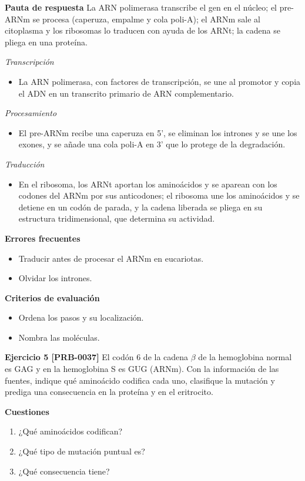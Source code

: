 \documentclass{book}
\begin{document}
\noindent\textbf{Pauta de respuesta}
La ARN polimerasa transcribe el gen en el núcleo; el pre-ARNm se procesa (caperuza, empalme y cola poli-A); el ARNm sale al citoplasma y los ribosomas lo traducen con ayuda de los ARNt; la cadena se pliega en una proteína.


\noindent\textit{Transcripción}
\begin{itemize}
\item La ARN polimerasa, con factores de transcripción, se une al promotor y copia el ADN en un transcrito primario de ARN complementario.
\end{itemize}

\noindent\textit{Procesamiento}
\begin{itemize}
\item El pre-ARNm recibe una caperuza en 5', se eliminan los intrones y se une los exones, y se añade una cola poli-A en 3' que lo protege de la degradación.
\end{itemize}

\noindent\textit{Traducción}
\begin{itemize}
\item En el ribosoma, los ARNt aportan los aminoácidos y se aparean con los codones del ARNm por sus anticodones; el ribosoma une los aminoácidos y se detiene en un codón de parada, y la cadena liberada se pliega en su estructura tridimensional, que determina su actividad.
\end{itemize}

\noindent\textbf{Errores frecuentes}
\begin{itemize}
\item Traducir antes de procesar el ARNm en eucariotas.
\item Olvidar los intrones.
\end{itemize}

\noindent\textbf{Criterios de evaluación}
\begin{itemize}
\item Ordena los pasos y su localización.
\item Nombra las moléculas.
\end{itemize}

\noindent\textbf{Ejercicio 5 [PRB-0037]}
El codón 6 de la cadena \(\beta\) de la hemoglobina normal es GAG y en la hemoglobina S es GUG (ARNm). Con la información de las fuentes, indique qué aminoácido codifica cada uno, clasifique la mutación y prediga una consecuencia en la proteína y en el eritrocito.


\noindent\textbf{Cuestiones}
\begin{enumerate}
\item ¿Qué aminoácidos codifican?
\item ¿Qué tipo de mutación puntual es?
\item ¿Qué consecuencia tiene?
\end{enumerate}
\end{document}
